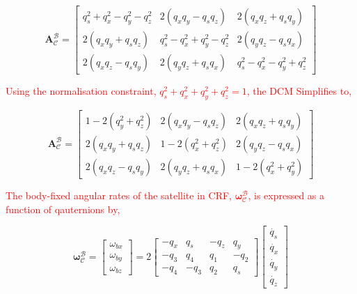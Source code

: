 \begin{equation}
    \mathbf{A}_{\mathcal{C}}^{\mathcal{B}} = 
    \begin{bmatrix}
    q_s^2 + q_x^2 - q_y^2 - q_z^2 & 2(q_x q_y - q_s q_z) & 2(q_x q_z + q_s q_y) \\
    2(q_x q_y + q_s q_z) & q_s^2 - q_x^2 + q_y^2 - q_z^2 & 2(q_y q_z - q_s q_x) \\
    2(q_x q_z - q_s q_y) & 2(q_y q_z + q_s q_x) & q_s^2 - q_x^2 - q_y^2 + q_z^2   
    \end{bmatrix}
\end{equation}

\textcolor{red}{Using the normalisation constraint, $q_s^2 + q_x^2 + q_y^2 + q_z^2 = 1$, the DCM Simplifies to,}

\begin{equation}
    \mathbf{A}_{\mathcal{C}}^{\mathcal{B}} = 
    \begin{bmatrix}
    1 - 2(q_y^2 + q_z^2) & 2(q_x q_y - q_s q_z) & 2(q_x q_z + q_s q_y) \\
    2(q_x q_y + q_s q_z) & 1 - 2(q_x^2 + q_z^2) & 2(q_y q_z - q_s q_x) \\
    2(q_x q_z - q_s q_y) & 2(q_y q_z + q_s q_x) & 1 - 2(q_x^2 + q_y^2)   
    \end{bmatrix}
\end{equation}

\textcolor{red}{The body-fixed angular rates of the satellite in CRF, $\mathbf{\omega}_{\mathcal{C}}^{\mathcal{B}}$, is expressed as a function of qauternions by,}

\begin{equation}
    \mathbf{\omega}_{\mathcal{C}}^{\mathcal{B}} = 
    \begin{bmatrix}
        \omega_{bx} \\ \omega_{by} \\ \omega_{bz}
    \end{bmatrix}
    = 2
    \begin{bmatrix}
       -q_x & q_s & -q_z & q_y \\
       -q_3 & q_4 & q_1 & -q_2 \\
       -q_4 & -q_3 & q_2 & q_s 
    \end{bmatrix}
    \begin{bmatrix}
        \dot{q_s} \\ \dot{q_x} \\ \dot{q_y} \\ \dot{q_z}
    \end{bmatrix}
\end{equation}

